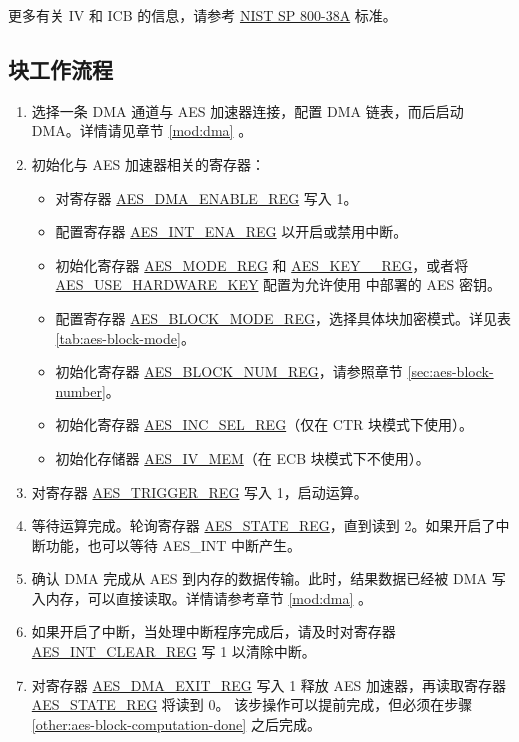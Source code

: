 \documentclass[main\_\_CN.tex]{subfiles}
\begin{document}
更多有关 IV 和 ICB 的信息，请参考 \href{https://nvlpubs.nist.gov/nistpubs/Legacy/SP/nistspecialpublication800-38a.pdf}{NIST SP 800-38A} 标准。

\subsection{块工作流程}

\begin{enumerate}
    \item 选择一条 DMA 通道与 AES 加速器连接，配置 DMA 链表，而后启动 DMA。详情请见章节 \ref{mod:dma} \textit{}。
    \item 初始化与 AES 加速器相关的寄存器：
    \begin{itemize}
        \item 对寄存器 \hyperref[regdesc:AESDMAENABLEREG]{AES\_DMA\_ENABLE\_REG} 写入 1。
        \item 配置寄存器 \hyperref[regdesc:AESINTENAREG]{AES\_INT\_ENA\_REG} 以开启或禁用中断。
        \item 初始化寄存器 \hyperref[regdesc:AESMODEREG]{AES\_MODE\_REG} 和 \hyperref[regdesc:AESKEYNREG]{AES\_KEY\_\_REG}，或者将 \hyperref[fielddesc:AESUSEHARDWAREKEY]{AES\_USE\_HARDWARE\_KEY} 配置为允许使用  中部署的 AES 密钥。
        \item 配置寄存器 \hyperref[regdesc:AESBLOCKMODEREG]{AES\_BLOCK\_MODE\_REG}，选择具体块加密模式。详见表 \ref{tab:aes-block-mode}。
        \item 初始化寄存器 \hyperref[regdesc:AESBLOCKNUMREG]{AES\_BLOCK\_NUM\_REG}，请参照章节 \ref{sec:aes-block-number}。
        \item 初始化寄存器 \hyperref[regdesc:AESINCSELREG]{AES\_INC\_SEL\_REG}（仅在 CTR 块模式下使用）。
        \item 初始化存储器 \hyperref[memdesc:AESIVMEM]{AES\_IV\_MEM}（在 ECB 块模式下不使用）。
    \end{itemize}
    \item 对寄存器 \hyperref[regdesc:AESTRIGGERREG]{AES\_TRIGGER\_REG} 写入 1，启动运算。
    \item \label{other:aes-block-computation-done} 等待运算完成。轮询寄存器 \hyperref[regdesc:AESSTATEREG]{AES\_STATE\_REG}，直到读到 2。如果开启了中断功能，也可以等待 AES\_INT 中断产生。
    \item 确认 DMA 完成从 AES 到内存的数据传输。此时，结果数据已经被 DMA 写入内存，可以直接读取。详情请参考章节 \ref{mod:dma} \textit{}。
    \item 如果开启了中断，当处理中断程序完成后，请及时对寄存器 \hyperref[regdesc:AESINTCLEARREG]{AES\_INT\_CLEAR\_REG} 写 1 以清除中断。
    \item 对寄存器 \hyperref[regdesc:AESDMAEXITREG]{AES\_DMA\_EXIT\_REG} 写入 1 释放 AES 加速器，再读取寄存器 \hyperref[regdesc:AESSTATEREG]{AES\_STATE\_REG} 将读到 0。
    该步操作可以提前完成，但必须在步骤 \ref{other:aes-block-computation-done} 之后完成。
\end{enumerate}
\end{document}
